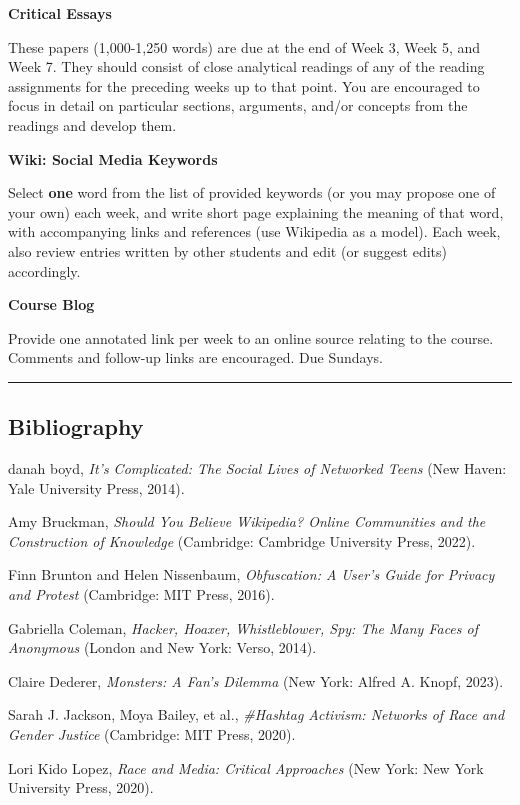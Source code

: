 \documentclass[
  letterpaper,
  DIV=11,
  numbers=noendperiod]{scrartcl}
\begin{document}
\textbf{Critical Essays}

These papers (1,000-1,250 words) are due at the end of Week 3, Week 5,
and Week 7. They should consist of close analytical readings of any of
the reading assignments for the preceding weeks up to that point. You
are encouraged to focus in detail on particular sections, arguments,
and/or concepts from the readings and develop them.

\textbf{Wiki: Social Media Keywords}

Select \textbf{one} word from the list of provided keywords (or you may
propose one of your own) each week, and write short page explaining the
meaning of that word, with accompanying links and references (use
Wikipedia as a model). Each week, also review entries written by other
students and edit (or suggest edits) accordingly.

\textbf{Course Blog}

Provide one annotated link per week to an online source relating to the
course. Comments and follow-up links are encouraged. Due Sundays.

\begin{center}\rule{0.5\linewidth}{0.5pt}\end{center}

\hypertarget{bibliography}{%
\subsection{Bibliography}\label{bibliography}}

danah boyd, \emph{It's Complicated: The Social Lives of Networked Teens}
(New Haven: Yale University Press, 2014).

Amy Bruckman, \emph{Should You Believe Wikipedia? Online Communities and
the Construction of Knowledge} (Cambridge: Cambridge University Press,
2022).

Finn Brunton and Helen Nissenbaum, \emph{Obfuscation: A User's Guide for
Privacy and Protest} (Cambridge: MIT Press, 2016).

Gabriella Coleman, \emph{Hacker, Hoaxer, Whistleblower, Spy: The Many
Faces of Anonymous} (London and New York: Verso, 2014).

Claire Dederer, \emph{Monsters: A Fan's Dilemma} (New York: Alfred A.
Knopf, 2023).

Sarah J. Jackson, Moya Bailey, et al., \emph{\#Hashtag Activism:
Networks of Race and Gender Justice} (Cambridge: MIT Press, 2020).

Lori Kido Lopez, \emph{Race and Media: Critical Approaches} (New York:
New York University Press, 2020).
\end{document}
